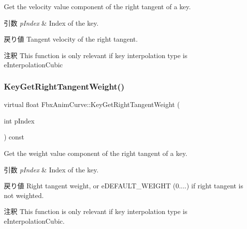Get the velocity value component of the right tangent of a key. 
\begin{DoxyParams}{引数}
{\em p\+Index} & Index of the key. \\
\hline
\end{DoxyParams}
\begin{DoxyReturn}{戻り値}
Tangent velocity of the right tangent. 
\end{DoxyReturn}
\begin{DoxyRemark}{注釈}
This function is only relevant if key interpolation type is e\+Interpolation\+Cubic 
\end{DoxyRemark}
\mbox{\label{class_fbx_anim_curve_a82f1cd10ca027ec52eb0facf47b9c9f4}} 
\subsubsection{\texorpdfstring{Key\+Get\+Right\+Tangent\+Weight()}{KeyGetRightTangentWeight()}}
{\footnotesize\ttfamily virtual float Fbx\+Anim\+Curve\+::\+Key\+Get\+Right\+Tangent\+Weight (\begin{DoxyParamCaption}\item[{int}]{p\+Index }\end{DoxyParamCaption}) const\hspace{0.3cm}{\ttfamily [pure virtual]}}

Get the weight value component of the right tangent of a key. 
\begin{DoxyParams}{引数}
{\em p\+Index} & Index of the key. \\
\hline
\end{DoxyParams}
\begin{DoxyReturn}{戻り値}
Right tangent weight, or e\+D\+E\+F\+A\+U\+L\+T\+\_\+\+W\+E\+I\+G\+HT (0....) if right tangent is not weighted. 
\end{DoxyReturn}
\begin{DoxyRemark}{注釈}
This function is only relevant if key interpolation type is e\+Interpolation\+Cubic. 
\end{DoxyRemark}
\mbox{\label{class_fbx_anim_curve_a5672d86518e0ceb21c4bcaf78f7f5bf6}} 
